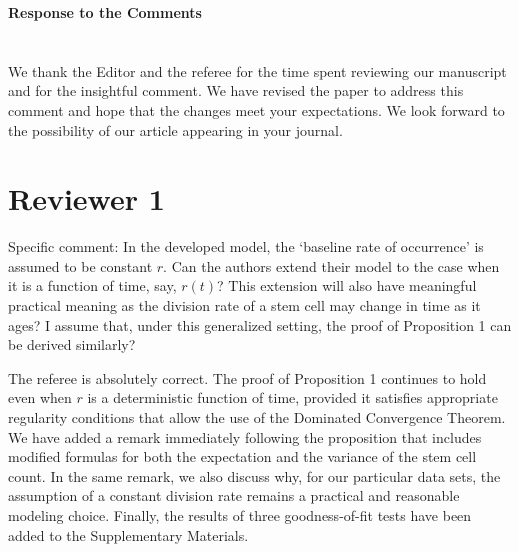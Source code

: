 \documentclass[12pt]{article}
\newenvironment{comment}%
{\begin{quoting}\noindent\small\it\color{blue2}\ignorespaces%
  }{\end{quoting}}
\begin{document}
\begin{center}
  {\Large\bf Response to the Comments}
\end{center}

\section*{}

We thank the Editor and the referee for the time spent reviewing our manuscript
and for the insightful comment. We have revised the paper to address this
comment and hope that the changes meet your expectations. We look forward
to the possibility of our article appearing in your journal.

\section*{Reviewer 1}

\begin{comment}
Specific comment: In the developed model, the ‘baseline rate of occurrence’ is
assumed to be constant $r$. Can the authors extend their model to the case when
it is a function of time, say, $r(t)$? This extension will also have meaningful
practical meaning as the division rate of a stem cell may change in time as it
ages? I assume that, under this generalized setting, the proof of Proposition 1
can be derived similarly?
\end{comment}

The referee is absolutely correct. The proof of Proposition 1 continues to hold
even when $r$ is a deterministic function of time, provided it satisfies
appropriate regularity conditions that allow the use of the Dominated Convergence
Theorem. We have added a remark immediately following the proposition that includes
modified formulas for both the expectation and the variance of the stem cell count.
In the same remark, we also discuss why, for our particular data sets,
the assumption of a constant division rate remains a practical and reasonable
modeling choice. Finally, the results of three goodness-of-fit tests have been 
added to the Supplementary Materials.
\end{document}
